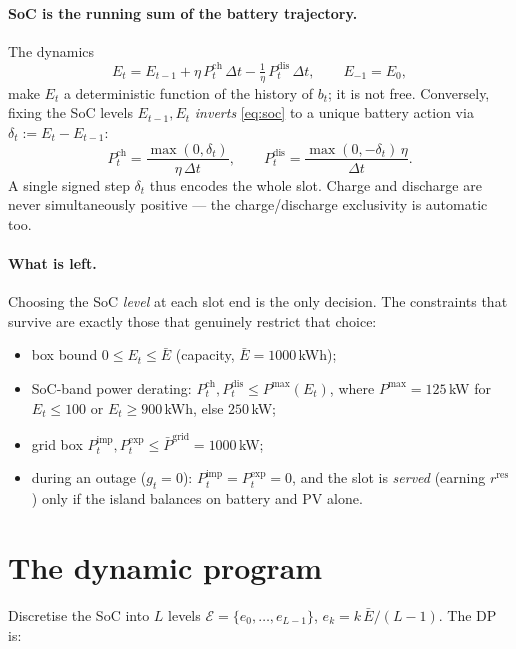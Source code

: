 \documentclass[11pt]{article}
\newcommand{\Pimp}{P^{\text{imp}}}
\newcommand{\Pexp}{P^{\text{exp}}}
\newcommand{\Pch}{P^{\text{ch}}}
\newcommand{\Pdis}{P^{\text{dis}}}
\newcommand{\rres}{r^{\text{res}}}
\begin{document}
\paragraph{SoC is the running sum of the battery trajectory.}
The dynamics
\begin{equation}
  E_t = E_{t-1} + \eta\,\Pch_t\,\Delta t - \tfrac{1}{\eta}\,\Pdis_t\,\Delta t,
  \qquad E_{-1}=E_0,
  \label{eq:soc}
\end{equation}
make $E_t$ a deterministic function of the history of $b_t$; it is not free.
Conversely, fixing the SoC levels $E_{t-1}, E_t$ \emph{inverts}
\eqref{eq:soc} to a unique battery action via $\delta_t := E_t - E_{t-1}$:
\begin{equation}
  \Pch_t = \frac{\max(0,\delta_t)}{\eta\,\Delta t}, \qquad
  \Pdis_t = \frac{\max(0,-\delta_t)\,\eta}{\Delta t}.
  \label{eq:invert}
\end{equation}
A single signed step $\delta_t$ thus encodes the whole slot. Charge and
discharge are never simultaneously positive --- the charge/discharge
exclusivity is automatic too.

\paragraph{What is left.} Choosing the SoC \emph{level} at each slot end is the
only decision. The constraints that survive are exactly those that genuinely
restrict that choice:
\begin{itemize}
  \item box bound $0 \le E_t \le \bar{E}$ (capacity, $\bar{E}=1000$\,kWh);
  \item SoC-band power derating: $\Pch_t,\Pdis_t \le P^{\max}(E_t)$, where
        $P^{\max}=125$\,kW for $E_t\le 100$ or $E_t\ge 900$\,kWh, else $250$\,kW;
  \item grid box $\Pimp_t,\Pexp_t \le \bar{P}^{\mathrm{grid}}=1000$\,kW;
  \item during an outage ($g_t=0$): $\Pimp_t=\Pexp_t=0$, and the slot is
        \emph{served} (earning $\rres$) only if the island balances on battery
        and PV alone.
\end{itemize}

\section{The dynamic program}

Discretise the SoC into $L$ levels
$\mathcal{E}=\{e_0,\dots,e_{L-1}\}$, $e_k = k\,\bar{E}/(L-1)$. The DP is:
\end{document}
